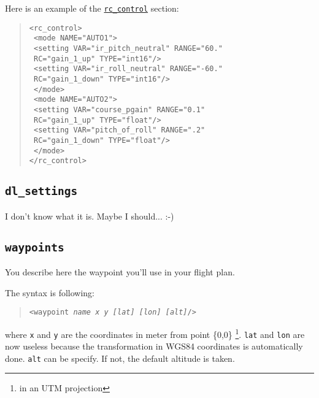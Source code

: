 \documentclass{article}
\renewcommand{\tt}[1]{\texttt{#1}}
\newcommand{\ex}[1]{\colorbox[gray]{0.92}{\tt{#1}}}
\newcommand{\hs}[1]{\hspace*{#1cm}}
\newcommand{\qt}[1]{\textcolor{gris75}{#1}}
\begin{document}
\begin{minipage}[ctb]{\textwidth}
Here is an example of the \hyperlink{rccontrol}{\tt{rc\_control}} section:
\begin{quote}
	\ex{<rc\_control>} \\
	\ex{\hs{0.5} <mode NAME="\qt{AUTO1}">} \\
	\ex{\hs{1} <setting VAR="\qt{ir\_pitch\_neutral}" RANGE="\qt{60.}"} \\
	\ex{\hs{2.7} RC="\qt{gain\_1\_up}" TYPE="\qt{int16}"/>} \\
	\ex{\hs{1} <setting VAR="\qt{ir\_roll\_neutral}" RANGE="\qt{-60.}"} \\
	\ex{\hs{2.7} RC="\qt{gain\_1\_down}" TYPE="\qt{int16}"/>} \\
	\ex{\hs{0.5} </mode>} \\
	\ex{\hs{0.5} <mode NAME="\qt{AUTO2}">} \\
	\ex{\hs{1} <setting VAR="\qt{course\_pgain}" RANGE="\qt{0.1}"} \\
	\ex{\hs{2.7} RC="\qt{gain\_1\_up}" TYPE="\qt{float}"/>} \\
	\ex{\hs{1} <setting VAR="\qt{pitch\_of\_roll}" RANGE="\qt{.2}"} \\
	\ex{\hs{2.7} RC="\qt{gain\_1\_down}" TYPE="\qt{float}"/>} \\
	\ex{\hs{0.5} </mode>} \\
	\ex{</rc\_control>} \\
\end{quote}
\end{minipage}


\hypertarget{dlsettings}{\subsection{\tt{dl\_settings}}}
I don't know what it is. Maybe I should...  :-)


\hypertarget{waypoints}{\subsection{\tt{waypoints}}}
\label{waypoints2}
You describe here the waypoint you'll use in your flight plan. \par
The syntax is following:
	\begin{quote}
		\tt{<waypoint \emph{name x y [lat] [lon] [alt]}/>}
	\end{quote}
\par
where \tt{x} and \tt{y} are the coordinates in meter from point \{0,0\}%
\footnote{in an UTM projection}. \tt{lat} and \tt{lon} are now useless because the transformation in WGS84 coordinates is automatically done. \tt{alt} can be specify. If not, the default altitude is taken.
\\
\end{document}

